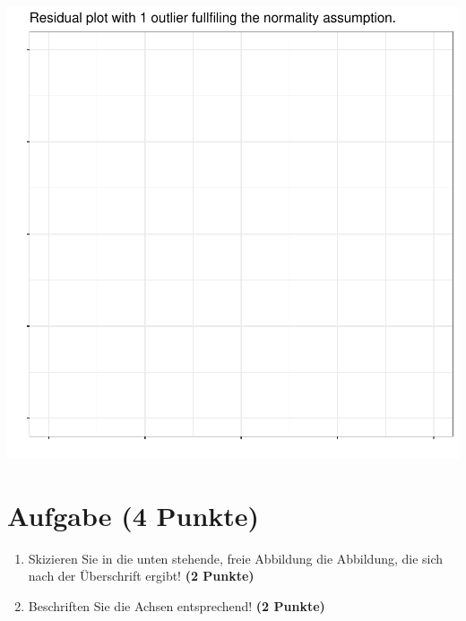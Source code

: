 \documentclass[a4paper, 10pt]{scrartcl}\usepackage[]{graphicx}\usepackage[]{color}
\makeatletter
\def\maxwidth{ %
  \ifdim\Gin@nat@width>\linewidth
    \linewidth
  \else
    \Gin@nat@width
  \fi
}
\makeatother
\begin{document}
{\centering \includegraphics[width=\maxwidth]{img/regression-03-1} 

}



 
\clearpage

\section{Aufgabe \hfill (4 Punkte)}



\begin{enumerate}
\item Skizieren Sie in die unten stehende, freie Abbildung die
  Abbildung, die sich nach der {\"U}berschrift ergibt! \textbf{(2 Punkte)}
\item Beschriften Sie die Achsen entsprechend! \textbf{(2 Punkte)}
\end{enumerate}
\end{document}
